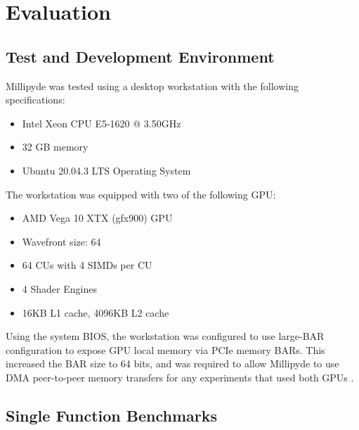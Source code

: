 

\chapter{Evaluation}

\section{Test and Development Environment}

Millipyde was tested using a desktop workstation with the following specifications: 
\begin{itemize}
  \item Intel Xeon CPU E5-1620 @ 3.50GHz
  \item 32 GB memory
  \item Ubuntu 20.04.3 LTS Operating System
\end{itemize}

The workstation was equipped with two of the following GPU:
\begin{itemize}
  \item AMD Vega 10 XTX (gfx900) GPU
  \item Wavefront size: 64
  \item 64 CUs with 4 SIMDs per CU
  \item 4 Shader Engines
  \item 16KB L1 cache, 4096KB L2 cache
\end{itemize}

\quad Using the system BIOS, the workstation was configured to use large-BAR configuration to expose GPU local memory via PCIe memory BARs. This increased the BAR size to 64 bits, and was required to allow Millipyde to use DMA peer-to-peer memory transfers for any experiments that used both GPUs \cite{rocmrdma}. 

\section{Single Function Benchmarks}

